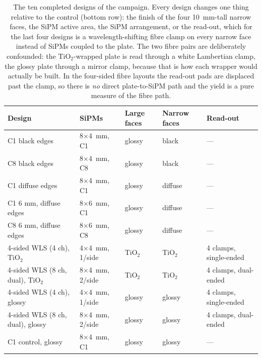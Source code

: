 \documentclass[11pt,a4paper]{article}
\begin{document}
\begin{table}[H]
\caption{The ten completed designs of the campaign. Every design changes one
thing relative to the control (bottom row): the finish of the four
\SI{10}{\milli\meter}-tall narrow faces, the SiPM active area, the SiPM
arrangement, or the read-out, which for the last four designs is a
wavelength-shifting fibre clamp on every narrow face instead of SiPMs coupled
to the plate. The two fibre pairs are deliberately confounded: the
TiO$_2$-wrapped plate is read through a white Lambertian clamp, the glossy
plate through a mirror clamp, because that is how each wrapper would actually
be built. In the four-sided fibre layouts the read-out pads are displaced past
the clamp, so there is \emph{no} direct plate-to-SiPM path and the yield is a
pure measure of the fibre path.}
\label{tab:designs}
\small
\setlength{\tabcolsep}{4pt}
\begin{tabular}{@{}lllll@{}}
\toprule
Design & SiPMs & Large faces & Narrow faces & Read-out \\
\midrule
C1 black edges            & \num{8}$\times$\SI{4}{\milli\meter}, C1 & glossy & black   & --- \\
C8 black edges            & \num{8}$\times$\SI{4}{\milli\meter}, C8 & glossy & black   & --- \\
\midrule
C1 diffuse edges          & \num{8}$\times$\SI{4}{\milli\meter}, C1 & glossy & diffuse & --- \\
C1 6 mm, diffuse edges    & \num{8}$\times$\SI{6}{\milli\meter}, C1 & glossy & diffuse & --- \\
C8 6 mm, diffuse edges    & \num{8}$\times$\SI{6}{\milli\meter}, C8 & glossy & diffuse & --- \\
\midrule
4-sided WLS (4 ch), TiO$_2$          & \num{4}$\times$\SI{4}{\milli\meter}, 1/side & TiO$_2$ & TiO$_2$ & 4 clamps, single-ended \\
4-sided WLS (8 ch, dual), TiO$_2$    & \num{8}$\times$\SI{4}{\milli\meter}, 2/side & TiO$_2$ & TiO$_2$ & 4 clamps, dual-ended \\
4-sided WLS (4 ch), glossy           & \num{4}$\times$\SI{4}{\milli\meter}, 1/side & glossy  & glossy  & 4 clamps, single-ended \\
4-sided WLS (8 ch, dual), glossy     & \num{8}$\times$\SI{4}{\milli\meter}, 2/side & glossy  & glossy  & 4 clamps, dual-ended \\
\midrule
C1 control, glossy        & \num{8}$\times$\SI{4}{\milli\meter}, C1 & glossy & glossy  & --- \\
\bottomrule
\end{tabular}
\end{table}
\end{document}
